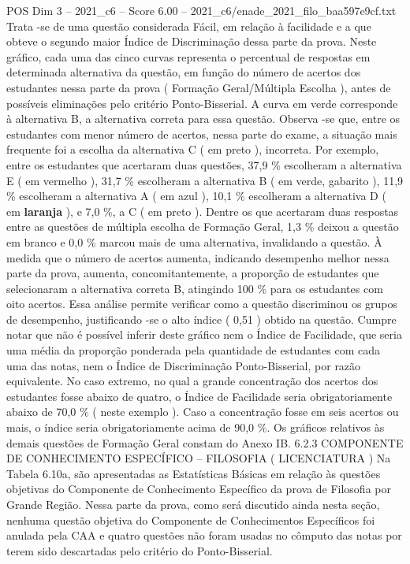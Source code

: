 \begin{textsample}{POS Dim 3 – 2021\_c6 – Score 6.00 – 2021\_c6/enade\_2021\_filo\_baa597e9cf.txt}
Trata -se de uma questão considerada Fácil, em relação à facilidade e a que obteve o segundo maior Índice de Discriminação dessa parte da prova.
Neste gráfico, cada uma das cinco curvas representa o percentual de respostas em determinada alternativa da questão, em função do número de acertos dos estudantes nessa parte da prova ( Formação Geral/Múltipla Escolha ), antes de possíveis eliminações pelo critério Ponto-Bisserial.
A curva em verde corresponde à alternativa B, a alternativa correta para essa questão.
Observa -se que, entre os estudantes com menor número de acertos, nessa parte do exame, a situação mais frequente foi a escolha da alternativa C ( em preto ), incorreta.
Por exemplo, entre os estudantes que acertaram duas questões, 37,9 \% escolheram a alternativa E ( em vermelho ), 31,7 \% escolheram a alternativa B ( em verde, gabarito ), 11,9 \% escolheram a alternativa A ( em azul ), 10,1 \% escolheram a alternativa D ( em \textbf{laranja} ), e 7,0 \%, a C ( em preto ).
Dentre os que acertaram duas respostas entre as questões de múltipla escolha de Formação Geral, 1,3 \% deixou a questão em branco e 0,0 \% marcou mais de uma alternativa, invalidando a questão.
À medida que o número de acertos aumenta, indicando desempenho melhor nessa parte da prova, aumenta, concomitantemente, a proporção de estudantes que selecionaram a alternativa correta B, atingindo 100 \% para os estudantes com oito acertos.
Essa análise permite verificar como a questão discriminou os grupos de desempenho, justificando -se o alto índice ( 0,51 ) obtido na questão.
Cumpre notar que não é possível inferir deste gráfico nem o Índice de Facilidade, que seria uma média da proporção ponderada pela quantidade de estudantes com cada uma das notas, nem o Índice de Discriminação Ponto-Bisserial, por razão equivalente.
No caso extremo, no qual a grande concentração dos acertos dos estudantes fosse abaixo de quatro, o Índice de Facilidade seria obrigatoriamente abaixo de 70,0 \% ( neste exemplo ).
Caso a concentração fosse em seis acertos ou mais, o índice seria obrigatoriamente acima de 90,0 \%.
Os gráficos relativos às demais questões de Formação Geral constam do Anexo IB. 6.2.3 COMPONENTE DE CONHECIMENTO ESPECÍFICO – FILOSOFIA ( LICENCIATURA ) Na Tabela 6.10a, são apresentadas as Estatísticas Básicas em relação às questões objetivas do Componente de Conhecimento Específico da prova de Filosofia por Grande Região.
Nessa parte da prova, como será discutido ainda nesta seção, nenhuma questão objetiva do Componente de Conhecimentos Específicos foi anulada pela CAA e quatro questões não foram usadas no cômputo das notas por terem sido descartadas pelo critério do Ponto-Bisserial.

\end{textsample}

